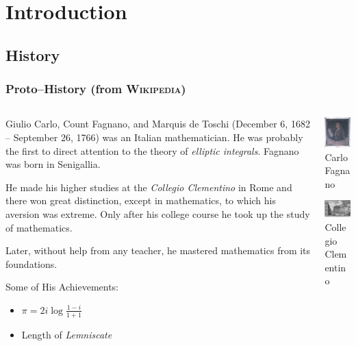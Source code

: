 \documentclass[10pt,final]{beamer} %
\date{}
\title[{Dipartim. Mat. \& Fis.}]{\insertlecture}
\subtitle{\ }
\author[\ \hspace{-2mm} Universit\`a Roma Tre]{Francesco Pappalardi}
\institute{Dipartimento di Matematica e Fisica\\
  Universit\`a Roma Tre}
\theoremstyle{definition}
\begin{document}
\begin{frame}
\titlepage
\end{frame}

\section{Introduction}
\subsection{History}

\begin{frame}\frametitle{Proto--History (from \textsc{Wikipedia})}

\begin{columns}[c]
\begin{column}{6cm}\begin{small}
Giulio Carlo, Count Fagnano, and Marquis de Toschi (December 6, 1682 -- September 26, 1766)
was an Italian mathematician. He was probably the first to direct attention to the theory of
\emph{elliptic integrals}. Fagnano was born in Senigallia.\medskip

He made his higher studies at the \emph{Collegio Clementino} in Rome and there won great distinction,
except in mathematics, to which his aversion was extreme. Only after his college course he took up the study of
mathematics.\medskip

Later, without help from any teacher, he mastered mathematics from its foundations.\end{small}
\begin{block}{Some of His Achievements:}
\begin{itemize}
 \item $\pi=2i\log\frac{1-i}{1+1}$
 \item Length of \emph{Lemniscate}
\end{itemize}
\end{block}
\end{column}
\begin{column}{4cm}
\includegraphics[width=2.5cm]{images/fagnano.jpg}\\
\scriptsize{Carlo Fagnano}
\bigskip

\includegraphics[width=2.5cm]{images/ColegioClementino.jpg}\\
\scriptsize{Collegio Clementino}
\bigskip


\end{column}
\end{columns}
\end{frame}
\end{document}
